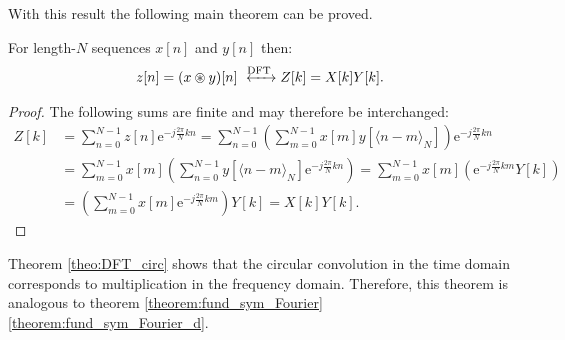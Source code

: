 With this result the following main theorem can be proved.

\begin{theorem} \label{theo:DFT_circ}
For length-$N$ sequences $x[n]$ and $y[n]$ then:
\begin{align*}
z[n] = (x \circledast y)[n] \xleftrightarrow{\text{DFT}} Z[k] = X[k] Y[k].
\end{align*}
\end{theorem}

\begin{proof}
The following sums are finite and may therefore be interchanged:
\begin{align*}
Z[k] &= \sum_{n=0}^{N-1} z[n] \text{e}^{-j\frac{2\pi}{N}kn} = \sum_{n=0}^{N-1} \left( \sum_{m=0}^{N-1} x[m] y[\langle n-m\rangle_N] \right) \text{e}^{-j\frac{2\pi}{N}kn} \\
&= \sum_{m=0}^{N-1} x[m] \left( \sum_{n=0}^{N-1} y[\langle n-m\rangle_N]\text{e}^{-j\frac{2\pi}{N}kn} \right) = \sum_{m=0}^{N-1} x[m] \left( \text{e}^{-j\frac{2\pi}{N}km}Y[k] \right) \\
&= \left( \sum_{m=0}^{N-1} x[m] \text{e}^{-j\frac{2\pi}{N}km} \right)Y[k] = X[k] Y[k].
\end{align*}
\end{proof}

Theorem \ref{theo:DFT_circ} shows that the circular convolution in the time domain corresponds to multiplication in the frequency domain. Therefore, this theorem is analogous to theorem \ref{theorem:fund_sym_Fourier}\ref{theorem:fund_sym_Fourier_d}.

